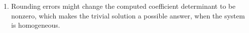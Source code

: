 \begin{enumerate}
\begin{enumerate}
\begin{align}
\begin{bNiceArray}{rrr|r}[margin]
                                 \columncolor[opacity=0.05]{black}{4}
                                 \Body
                                 9 & 5 & -1 & 13 \\
                                 0 & \frac{4}{9} & \frac{10}{9} & \frac{5}{3} \\
                                 0 & - \frac{2}{9} & - \frac{5}{9} & - \frac{7}{9} \\
                             \end{bNiceArray} &
                         & = \begin{bNiceArray}{rrr|r}[margin]
                                 \CodeBefore
                                 \columncolor[opacity=0.05]{black}{4}
                                 \Body
                                 9 & 5 & -1 & 13 \\
                                 0 & 4 & 10 & 15 \\
                                 0 & -2 & -5 & -7 \\
                             \end{bNiceArray}               \\
                         & = \begin{bNiceArray}{rrr|r}[margin]
                                 \CodeBefore
                                 \columncolor[opacity=0.05]{black}{4}
                                 \Body
                                 9 & 5 & -1 & 13 \\
                                 0 & 4 & 10 & 14 \\
                                 0 & 0 & 0 & 0.5 \\
                             \end{bNiceArray}                 &
                         & \text{no solution}
                    \end{align}

              \item Rounding errors might change the computed coefficient determinant
                    to be nonzero, which makes the trivial solution a possible answer,
                    when the system is homogeneous.


\end{enumerate}
\end{enumerate}
